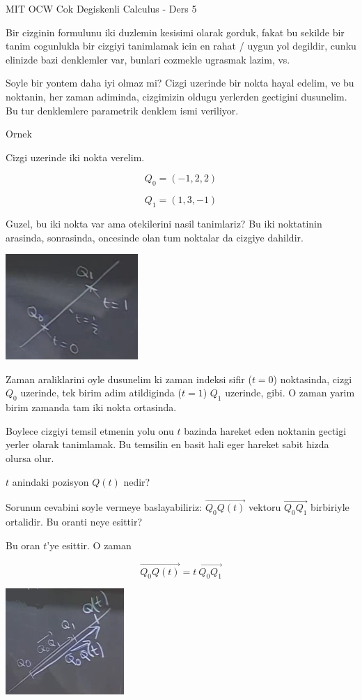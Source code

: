 \documentclass[12pt,fleqn]{article}
\begin{document}
MIT OCW Cok Degiskenli Calculus - Ders 5

Bir cizginin formulunu iki duzlemin kesisimi olarak gorduk, fakat bu
sekilde bir tanim cogunlukla bir cizgiyi tanimlamak icin en rahat / uygun
yol degildir, cunku elinizde bazi denklemler var, bunlari cozmekle ugrasmak
lazim, vs. 

Soyle bir yontem daha iyi olmaz mi? Cizgi uzerinde bir nokta hayal edelim,
ve bu noktanin, her zaman adiminda, cizgimizin oldugu yerlerden gectigini
dusunelim. Bu tur denklemlere parametrik denklem ismi veriliyor. 

Ornek

Cizgi uzerinde iki nokta verelim. 

\[ Q_0 = (-1,2,2) \]

\[ Q_1 = (1,3,-1) \]

Guzel, bu iki nokta var ama otekilerini nasil tanimlariz? Bu iki noktatinin
arasinda, sonrasinda, oncesinde olan tum noktalar da cizgiye dahildir. 

\includegraphics[height=4cm]{5_1.png}

Zaman araliklarini oyle dusunelim ki zaman indeksi sifir ($t=0$)
noktasinda, cizgi $Q_0$ uzerinde, tek birim adim atildiginda ($t=1$)  $Q_1$
uzerinde, gibi. O zaman yarim birim zamanda tam iki nokta ortasinda. 

Boylece cizgiyi temsil etmenin yolu onu $t$ bazinda hareket eden noktanin
gectigi yerler olarak tanimlamak. Bu temsilin en basit hali eger hareket
sabit hizda olursa olur. 

$t$ anindaki pozisyon $Q(t)$ nedir? 

Sorunun cevabini soyle vermeye baslayabiliriz: $\vec{Q_0Q(t)}$ vektoru
$\vec{Q_0Q_1}$ birbiriyle ortalidir. Bu oranti neye esittir? 

Bu oran $t$'ye esittir. O zaman

\[ \vec{Q_0Q(t)} = t \ \vec{Q_0Q_1}  \]

\includegraphics[height=4cm]{5_2.png}
\end{document}
